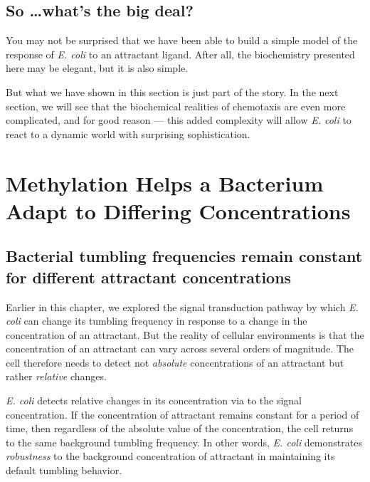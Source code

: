 \FloatBarrier
{}
\subsection{So \ldots what's the big deal?}

You may not be surprised that we have been able to build a simple model of the response of \textit{E. coli} to an attractant ligand. After all, the biochemistry presented here may be elegant, but it is also simple.

But what we have shown in this section is just part of the story. In the next section, we will see that the biochemical realities of chemotaxis are even more complicated, and for good reason --- this added complexity will allow \textit{E. coli} to react to a dynamic world with surprising sophistication.\\

\FloatBarrier
{}

\section{Methylation Helps a Bacterium Adapt to Differing Concentrations}
\label{sec:methylation}

\subsection{Bacterial tumbling frequencies remain constant for different attractant concentrations}

Earlier in this chapter, we explored the signal transduction pathway by which \textit{E. coli} can change its tumbling frequency in response to a change in the concentration of an attractant. But the reality of cellular environments is that the concentration of an attractant can vary across several orders of magnitude. The cell therefore needs to detect not \textit{absolute} concentrations of an attractant but rather \textit{relative} changes.

\textit{E. coli} detects relative changes in its concentration via  to the signal concentration. If the concentration of attractant remains constant for a period of time, then regardless of the absolute value of the concentration, the cell returns to the same background tumbling frequency. In other words, \textit{E. coli} demonstrates \textit{robustness} to the background concentration of attractant in maintaining its default tumbling behavior.


